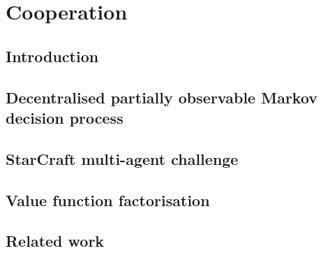\chapter{Cooperation}\label{ch:cooperation}
\section{Introduction}
\section{Decentralised partially observable Markov decision process}
\section{StarCraft multi-agent challenge}
\section{Value function factorisation}
\section{Related work}

